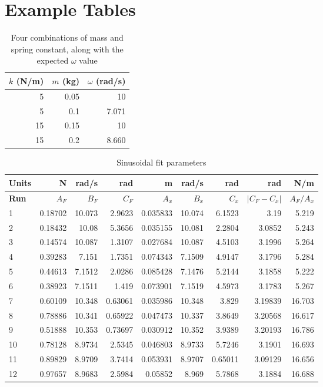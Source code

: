 \section{Example Tables}
%
\begin{table}[ht]
    \centering
    \begin{tabular}{r|r|r}
        $k$ (N/m) & $m$ (kg) & $\omega$ (rad/s) \\ \hline
        5 & 0.05 & 10 \\
        5 & 0.1 & 7.071 \\
        15 & 0.15 & 10 \\
        15 & 0.2 & 8.660 \\
        \hline
    \end{tabular}
    \caption{Four combinations of mass and spring constant, along with the expected $\omega$ value}
    \label{table.11.parameters}
\end{table}
%
\begin{table}[ht]
    \centering
    \begin{tabular}{l|r|r|r|r|r|r|r|r}
        \textbf{Units} & N & rad/s & rad & m & rad/s & rad & rad & N/m \\
        \hline
        \textbf{Run} & $A_{F}$ & $B_{F}$ & $C_{F}$ & $A_{x}$ & $B_{x}$ & $C_{x}$ & $\vert C_{F} - C_{x} \vert$ & $A_{F} / A_{x}$ \\
        \hline
        1 & 0.18702 & 10.073 & 2.9623 & 0.035833 & 10.074 & 6.1523 & 3.19 & 5.219 \\
        2 & 0.18432 & 10.08 & 5.3656 & 0.035155 & 10.081 & 2.2804 & 3.0852 & 5.243 \\
        3 & 0.14574 & 10.087 & 1.3107 & 0.027684 & 10.087 & 4.5103 & 3.1996 & 5.264 \\
        \hline
        4 & 0.39283 & 7.151 & 1.7351 & 0.074343 & 7.1509 & 4.9147 & 3.1796 & 5.284 \\
        5 & 0.44613 & 7.1512 & 2.0286 & 0.085428 & 7.1476 & 5.2144 & 3.1858 & 5.222 \\
        6 & 0.38923 & 7.1511 & 1.419 & 0.073901 & 7.1519 & 4.5973 & 3.1783 & 5.267 \\
        \hline
        7 & 0.60109 & 10.348 & 0.63061 & 0.035986 & 10.348 & 3.829 & 3.19839 & 16.703 \\
        8 & 0.78886 & 10.341 & 0.65922 & 0.047473 & 10.337 & 3.8649 & 3.20568 & 16.617 \\
        9 & 0.51888 & 10.353 & 0.73697 & 0.030912 & 10.352 & 3.9389 & 3.20193 & 16.786 \\
        \hline
        10 & 0.78128 & 8.9734 & 2.5345 & 0.046803 & 8.9733 & 5.7246 & 3.1901 & 16.693 \\
        11 & 0.89829 & 8.9709 & 3.7414 & 0.053931 & 8.9707 & 0.65011 & 3.09129 & 16.656 \\
        12 & 0.97657 & 8.9683 & 2.5984 & 0.05852 & 8.969 & 5.7868 & 3.1884 & 16.688 \\
        \hline
    \end{tabular}
    \caption{Sinusoidal fit parameters}
    \label{table.11.fit}
\end{table}

